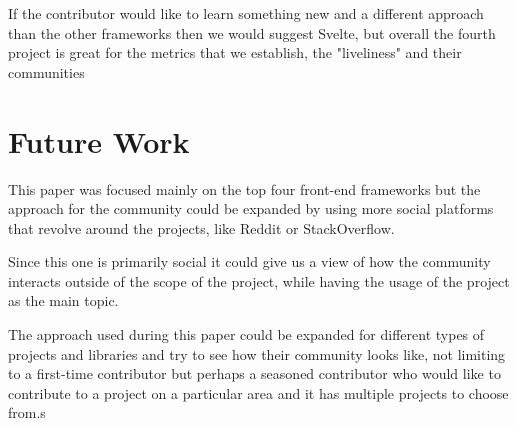 If the contributor would like to learn something new and a different approach than the other frameworks then we would suggest Svelte, but overall the fourth project is great for the metrics that we establish, the "liveliness" and their communities

\section{Future Work}
This paper was focused mainly on the top four front-end frameworks but the approach for the community could be expanded by using more social platforms that revolve around the projects, like Reddit or StackOverflow.

Since this one is primarily social it could give us a view of how the community interacts outside of the scope of the project, while having the usage of the project as the main topic.

The approach used during this paper could be expanded for different types of projects and libraries and try to see how their community looks like, not limiting to a first-time contributor but perhaps a seasoned contributor who would like to contribute to a project on a particular area and it has multiple projects to choose from.s

